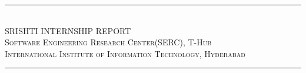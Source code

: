 \newcommand{\HRule}{\rule{\linewidth}{0.1mm}} 
\center %


\begin{figure}%
    \centering
    \hfill
    \vrule height 8em depth 5mm width 1pt
    \hspace{0.12\textwidth}
    \qquad
    
\end{figure}


\HRule \\[0.4cm]
{ \huge SRISHTI INTERNSHIP REPORT}\\[0.1cm] %
 
 \textsc{Software Engineering Research Center(SERC), T-Hub}\\[0.1cm]
 \textsc{International Institute of Information Technology, Hyderabad}
 \HRule \\[1.5cm]
 

